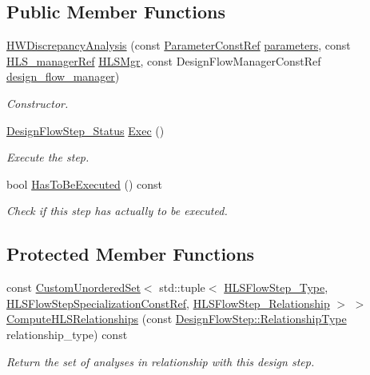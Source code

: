 \subsection*{Public Member Functions}
\begin{DoxyCompactItemize}
\item 
\hyperlink{classHWDiscrepancyAnalysis_ad14caf48e75bc3e791150c6d9efeee7a}{H\+W\+Discrepancy\+Analysis} (const \hyperlink{Parameter_8hpp_a37841774a6fcb479b597fdf8955eb4ea}{Parameter\+Const\+Ref} \hyperlink{classDesignFlowStep_a802eaafe8013df706370679d1a436949}{parameters}, const \hyperlink{hls__manager_8hpp_acd3842b8589fe52c08fc0b2fcc813bfe}{H\+L\+S\+\_\+manager\+Ref} \hyperlink{classHLS__step_ade85003a99d34134418451ddc46a18e9}{H\+L\+S\+Mgr}, const Design\+Flow\+Manager\+Const\+Ref \hyperlink{classDesignFlowStep_ab770677ddf087613add30024e16a5554}{design\+\_\+flow\+\_\+manager})
\begin{DoxyCompactList}\small\item\em Constructor. \end{DoxyCompactList}\item 
\hyperlink{design__flow__step_8hpp_afb1f0d73069c26076b8d31dbc8ebecdf}{Design\+Flow\+Step\+\_\+\+Status} \hyperlink{classHWDiscrepancyAnalysis_ab5f7d26b554925eb5a558fcfeaaf01d2}{Exec} ()
\begin{DoxyCompactList}\small\item\em Execute the step. \end{DoxyCompactList}\item 
bool \hyperlink{classHWDiscrepancyAnalysis_a9cc845a4b074af79cc881f8bc021de55}{Has\+To\+Be\+Executed} () const
\begin{DoxyCompactList}\small\item\em Check if this step has actually to be executed. \end{DoxyCompactList}\end{DoxyCompactItemize}
\subsection*{Protected Member Functions}
\begin{DoxyCompactItemize}
\item 
const \hyperlink{classCustomUnorderedSet}{Custom\+Unordered\+Set}$<$ std\+::tuple$<$ \hyperlink{hls__step_8hpp_ada16bc22905016180e26fc7e39537f8d}{H\+L\+S\+Flow\+Step\+\_\+\+Type}, \hyperlink{hls__step_8hpp_a5fdd2edf290c196531d21d68e13f0e74}{H\+L\+S\+Flow\+Step\+Specialization\+Const\+Ref}, \hyperlink{hls__step_8hpp_a3ad360b9b11e6bf0683d5562a0ceb169}{H\+L\+S\+Flow\+Step\+\_\+\+Relationship} $>$ $>$ \hyperlink{classHWDiscrepancyAnalysis_a5500a8e705ce27d9c0f39e3f8474714f}{Compute\+H\+L\+S\+Relationships} (const \hyperlink{classDesignFlowStep_a723a3baf19ff2ceb77bc13e099d0b1b7}{Design\+Flow\+Step\+::\+Relationship\+Type} relationship\+\_\+type) const
\begin{DoxyCompactList}\small\item\em Return the set of analyses in relationship with this design step. \end{DoxyCompactList}\end{DoxyCompactItemize}
